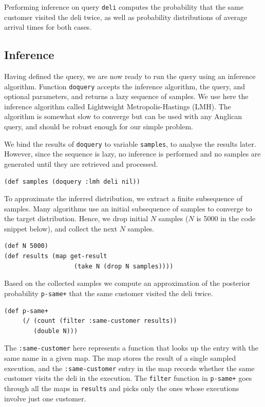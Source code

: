 \documentclass[preprint]{sigplanconf}
\begin{document}
Performing inference on query \texttt{deli} computes the
probability that the same customer visited the deli twice, as
well as probability distributions of average arrival times for
both cases.

\subsection{Inference}
\label{seq:deli-inference}

Having defined the query, we are now ready to run the query
using an inference algorithm. Function
\texttt{doquery}\iftoggle{full}{ provided
by the \texttt{anglican.core} namespace}{} accepts the inference
algorithm, the query, and optional parameters, and returns a
lazy sequence of samples. We use here the inference algorithm
called Lightweight Metropolis-Hastings (LMH). The algorithm is
somewhat slow to converge but can be used with any Anglican
query, and should be robust enough for our simple problem.

We bind the results of \texttt{doquery} to variable
\texttt{samples}, to analyse the results later. However, since
the sequence is lazy, no inference is performed and no samples
are generated until they are retrieved and processed.

\begin{lstlisting}[style=default]
(def samples (doquery :lmh deli nil))
\end{lstlisting}

To approximate the inferred distribution, we extract a finite
subsequence of samples. Many algorithms use an initial
subsequence of samples to converge to the target distribution.
Hence, we drop initial $N$ samples ($N$ is 5000 in the code
snippet below), and collect the next $N$ samples.

\begin{lstlisting}[style=default]
(def N 5000)
(def results (map get-result
                   (take N (drop N samples))))
\end{lstlisting}

Based on the collected samples we compute an approximation of
the posterior probability \texttt{p-same+} that the same
customer visited the deli twice.

\begin{lstlisting}[style=default]
(def p-same+ 
     (/ (count (filter :same-customer results))
        (double N)))
\end{lstlisting}
The \texttt{:same-customer} here represents a function
that looks up the entry with the same name in a given map.
The map stores the result of a single sampled execution,
and the \texttt{:same-customer} entry in the map
records whether the same customer visits the deli in the execution.
The \texttt{filter} function in \texttt{p-same+} 
goes through all the maps in \texttt{results}
and picks only the ones whose executions involve just one customer.
\end{document}
